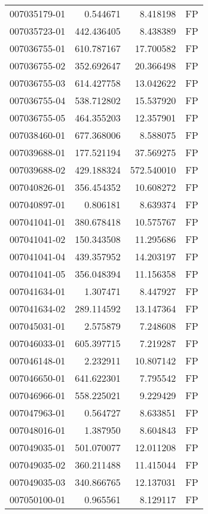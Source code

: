 \begin{tabular}{lrrl}
007035179-01 &    0.544671 &     8.418198 &   FP \\
007035723-01 &  442.436405 &     8.438389 &   FP \\
007036755-01 &  610.787167 &    17.700582 &   FP \\
007036755-02 &  352.692647 &    20.366498 &   FP \\
007036755-03 &  614.427758 &    13.042622 &   FP \\
007036755-04 &  538.712802 &    15.537920 &   FP \\
007036755-05 &  464.355203 &    12.357901 &   FP \\
007038460-01 &  677.368006 &     8.588075 &   FP \\
007039688-01 &  177.521194 &    37.569275 &   FP \\
007039688-02 &  429.188324 &   572.540010 &   FP \\
007040826-01 &  356.454352 &    10.608272 &   FP \\
007040897-01 &    0.806181 &     8.639374 &   FP \\
007041041-01 &  380.678418 &    10.575767 &   FP \\
007041041-02 &  150.343508 &    11.295686 &   FP \\
007041041-04 &  439.357952 &    14.203197 &   FP \\
007041041-05 &  356.048394 &    11.156358 &   FP \\
007041634-01 &    1.307471 &     8.447927 &   FP \\
007041634-02 &  289.114592 &    13.147364 &   FP \\
007045031-01 &    2.575879 &     7.248608 &   FP \\
007046033-01 &  605.397715 &     7.219287 &   FP \\
007046148-01 &    2.232911 &    10.807142 &   FP \\
007046650-01 &  641.622301 &     7.795542 &   FP \\
007046966-01 &  558.225021 &     9.229429 &   FP \\
007047963-01 &    0.564727 &     8.633851 &   FP \\
007048016-01 &    1.387950 &     8.604843 &   FP \\
007049035-01 &  501.070077 &    12.011208 &   FP \\
007049035-02 &  360.211488 &    11.415044 &   FP \\
007049035-03 &  340.866765 &    12.137031 &   FP \\
007050100-01 &    0.965561 &     8.129117 &   FP \\

\end{tabular}
